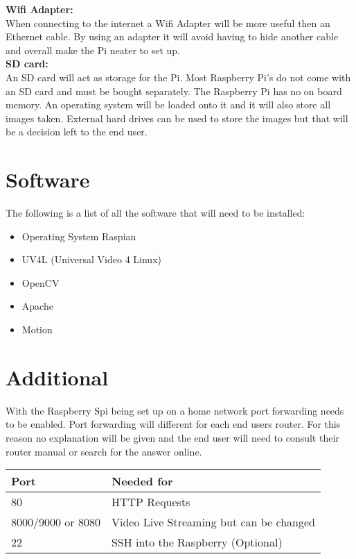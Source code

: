 \documentclass[]{report}   %
\begin{document}
{\bf Wifi Adapter:}\\
When connecting to the internet a Wifi Adapter will be more useful then an Ethernet cable. By using an adapter it will avoid having to hide another cable and overall make the Pi neater to set up. \\

{\bf SD card:}\\
An SD card will act as storage for the Pi. Most Raspberry Pi's do not come with an SD card and must be bought separately. The Raspberry Pi has no on board memory. An operating system will be loaded onto it and it will also store all images taken. External hard drives can be used to store the images but that will be a decision left to the end user.\\


\section {Software}	
\label {sec:software}	
The following is a list of all the software that will need to be installed:
\begin {itemize}

  \item Operating System Raspian 
  \item UV4L (Universal Video 4 Linux)  
  \item OpenCV
  \item Apache
  \item Motion

\end {itemize}

\section {Additional}	
\label {sec:additional}
With the Raspberry Spi being set up on a home network port forwarding needs to be enabled. Port forwarding will different for each end users router. For this reason no explanation will be given and the end user will need to consult their router manual or search for the answer online. 

\begin{center}
    \begin{tabular}{ | l | p{7cm} |}
    \hline
    {\bf Port} & {\bf Needed for} \\ \hline
   80 & HTTP Requests \\ \hline 
   8000/9000 or 8080 & Video Live Streaming but can be changed\\ \hline
	22 & SSH into the Raspberry (Optional) \\ \hline
    \end{tabular}
    \\[0.5cm]
\end{center} 
\end{document}
